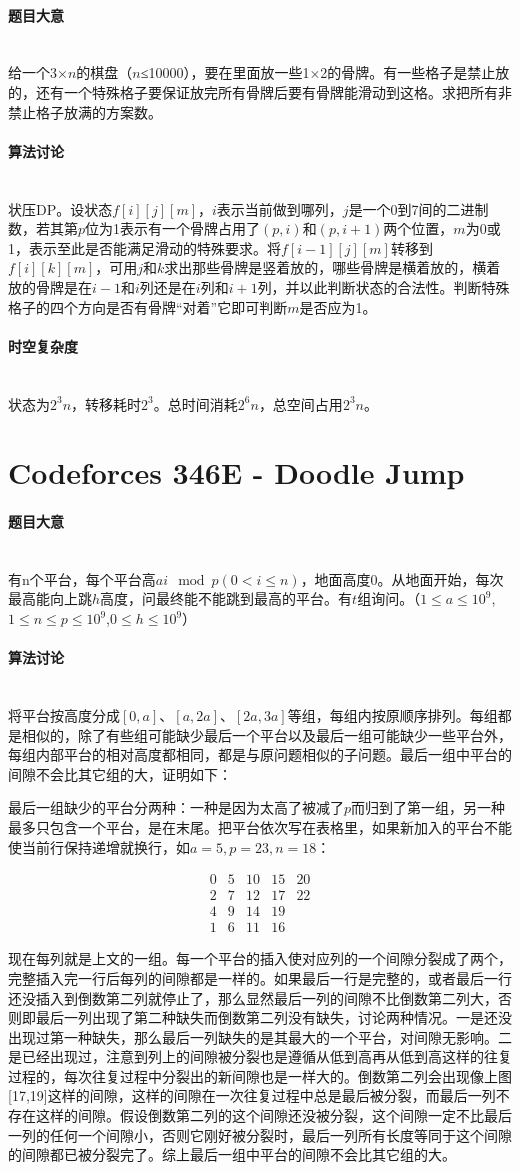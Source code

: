 \documentclass[UTF8]{ctexart}
\newcommand{\myparagraph}[1]{\paragraph{#1}\mbox{}\\}
\theoremstyle{nonumberplain}
\begin{document}
		\myparagraph{题目大意}
		
			给一个3×$n$的棋盘（$n$≤10000），要在里面放一些1×2的骨牌。有一些格子是禁止放的，还有一个特殊格子要保证放完所有骨牌后要有骨牌能滑动到这格。求把所有非禁止格子放满的方案数。
		
		\myparagraph{算法讨论}
		
			状压DP。设状态$f[i][j][m]$，$i$表示当前做到哪列，$j$是一个0到7间的二进制数，若其第$p$位为1表示有一个骨牌占用了$(p,i)$和$(p,i+1)$两个位置，$m$为0或1，表示至此是否能满足滑动的特殊要求。将$f[i-1][j][m]$转移到$f[i][k][m]$，可用$j$和$k$求出那些骨牌是竖着放的，哪些骨牌是横着放的，横着放的骨牌是在$i-1$和$i$列还是在$i$列和$i+1$列，并以此判断状态的合法性。判断特殊格子的四个方向是否有骨牌“对着”它即可判断$m$是否应为1。
			
		
		\myparagraph{时空复杂度}
		
			状态为$2^3n$，转移耗时$2^3$。总时间消耗$2^6n$，总空间占用$2^3n$。
	
	\section{Codeforces 346E - Doodle Jump}
		
		\myparagraph{题目大意}
		
			有n个平台，每个平台高$ai \mod p (0<i \leq n)$，地面高度0。从地面开始，每次最高能向上跳$h$高度，问最终能不能跳到最高的平台。有$t$组询问。（$1 \leq a \leq 10^9$,$1 \leq n \leq p \leq 10^9$,$0 \leq h \leq 10^9$）
		
		\myparagraph{算法讨论}
		
			将平台按高度分成$[0,a]$、$[a,2a]$、$[2a,3a]$等组，每组内按原顺序排列。每组都是相似的，除了有些组可能缺少最后一个平台以及最后一组可能缺少一些平台外，每组内部平台的相对高度都相同，都是与原问题相似的子问题。最后一组中平台的间隙不会比其它组的大，证明如下：
			
			最后一组缺少的平台分两种：一种是因为太高了被减了$p$而归到了第一组，另一种最多只包含一个平台，是在末尾。把平台依次写在表格里，如果新加入的平台不能使当前行保持递增就换行，如$a=5,p=23,n=18$：
			
			$$\begin{array}{ccccc}
				0 & 5 & 10 & 15 & 20 \\
				2 & 7 & 12 & 17 & 22 \\
				4 & 9 & 14 & 19 & \\
				1 & 6 & 11 & 16 &
			\end{array}$$
			
			现在每列就是上文的一组。每一个平台的插入使对应列的一个间隙分裂成了两个，完整插入完一行后每列的间隙都是一样的。如果最后一行是完整的，或者最后一行还没插入到倒数第二列就停止了，那么显然最后一列的间隙不比倒数第二列大，否则即最后一列出现了第二种缺失而倒数第二列没有缺失，讨论两种情况。一是还没出现过第一种缺失，那么最后一列缺失的是其最大的一个平台，对间隙无影响。二是已经出现过，注意到列上的间隙被分裂也是遵循从低到高再从低到高这样的往复过程的，每次往复过程中分裂出的新间隙也是一样大的。倒数第二列会出现像上图[17,19]这样的间隙，这样的间隙在一次往复过程中总是最后被分裂，而最后一列不存在这样的间隙。假设倒数第二列的这个间隙还没被分裂，这个间隙一定不比最后一列的任何一个间隙小，否则它刚好被分裂时，最后一列所有长度等同于这个间隙的间隙都已被分裂完了。综上最后一组中平台的间隙不会比其它组的大。
			
\end{document}
